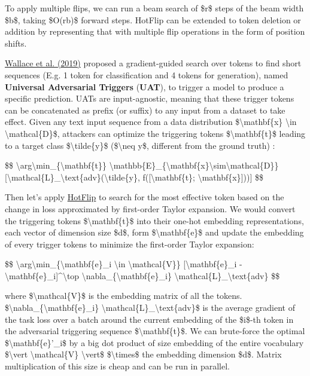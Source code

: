To apply multiple flips, we can run a beam search of \$r\$ steps of the beam width \$b\$, taking \$O(rb)\$ forward steps. HotFlip can be extended to token deletion or addition by representing that with multiple flip operations in the form of position shifts.

\label{UAT}{}\href{https://arxiv.org/abs/1908.07125}{Wallace et al. (2019)} proposed a gradient-guided search over tokens to find short sequences (E.g. 1 token for classification and 4 tokens for generation), named \textbf{Universal Adversarial Triggers} (\textbf{UAT}), to trigger a model to produce a specific prediction. UATs are input-agnostic, meaning that these trigger tokens can be concatenated as prefix (or suffix) to any input from a dataset to take effect. Given any text input sequence from a data distribution \$\textbackslash mathbf\{x\} \textbackslash in \textbackslash mathcal\{D\}\$, attackers can optimize the triggering tokens \$\textbackslash mathbf\{t\}\$ leading to a target class \$\textbackslash tilde\{y\}\$ (\$\textbackslash neq y\$, different from the ground truth) :

\$\$ \textbackslash arg\textbackslash min\_\{\textbackslash mathbf\{t\}\} \textbackslash mathbb\{E\}\_\{\textbackslash mathbf\{x\}\textbackslash sim\textbackslash mathcal\{D\}\} {[}\textbackslash mathcal\{L\}\_\textbackslash text\{adv\}(\textbackslash tilde\{y\}, f({[}\textbackslash mathbf\{t\}; \textbackslash mathbf\{x\}{]})){]} \$\$

Then let's apply \hyperref[hotflip]{HotFlip} to search for the most effective token based on the change in loss approximated by first-order Taylor expansion. We would convert the triggering tokens \$\textbackslash mathbf\{t\}\$ into their one-hot embedding representations, each vector of dimension size \$d\$, form \$\textbackslash mathbf\{e\}\$ and update the embedding of every trigger tokens to minimize the first-order Taylor expansion:

\$\$ \textbackslash arg\textbackslash min\_\{\textbackslash mathbf\{e\}\textquotesingle\_i \textbackslash in \textbackslash mathcal\{V\}\} {[}\textbackslash mathbf\{e\}\textquotesingle\_i - \textbackslash mathbf\{e\}\_i{]}\^{}\textbackslash top \textbackslash nabla\_\{\textbackslash mathbf\{e\}\_i\} \textbackslash mathcal\{L\}\_\textbackslash text\{adv\} \$\$

where \$\textbackslash mathcal\{V\}\$ is the embedding matrix of all the tokens. \$\textbackslash nabla\_\{\textbackslash mathbf\{e\}\_i\} \textbackslash mathcal\{L\}\_\textbackslash text\{adv\}\$ is the average gradient of the task loss over a batch around the current embedding of the \$i\$-th token in the adversarial triggering sequence \$\textbackslash mathbf\{t\}\$. We can brute-force the optimal \$\textbackslash mathbf\{e\}'\_i\$ by a big dot product of size embedding of the entire vocabulary \$\textbackslash vert \textbackslash mathcal\{V\} \textbackslash vert\$ \$\textbackslash times\$ the embedding dimension \$d\$. Matrix multiplication of this size is cheap and can be run in parallel.

